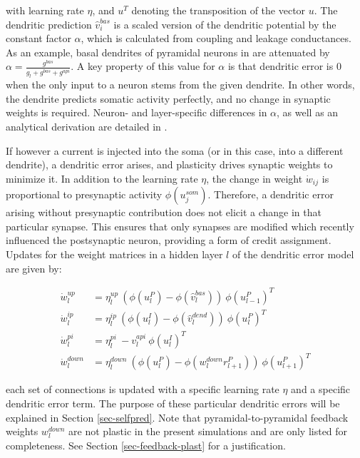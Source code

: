with learning rate $\eta$, and $u^T$ denoting the transposition of the vector $u$. The dendritic prediction
$\hat{v}_i^{bas}$ is a scaled version of the dendritic potential by the constant factor $\alpha$, which is calculated
from coupling and leakage conductances. As an example, basal dendrites of pyramidal neurons in
\citep{sacramento2018dendritic} are attenuated by $\alpha = \frac{g^{bas}}{g_l + g^{bas} + g^{api}}$. A key property of
this value for $\alpha$ is that dendritic error is $0$ when the only input to a neuron stems from the given dendrite.
In other words, the dendrite predicts somatic activity perfectly, and no change in synaptic weights is required. Neuron-
and layer-specific differences in $\alpha$, as well as an analytical derivation are detailed in
\citep{sacramento2018dendritic}.

If however a current is injected into the soma (or in this case, into a different dendrite), a dendritic error arises,
and plasticity drives synaptic weights to minimize it. In addition to the learning rate $\eta$, the change in weight
$\dot{w}_{ij}$ is proportional to presynaptic activity $\phi(u_j^{som})$. Therefore, a dendritic error arising without
presynaptic contribution does not elicit a change in that particular synapse. This ensures that only synapses are
modified which recently influenced the postsynaptic neuron, providing a form of credit assignment. Updates for the
weight matrices in a hidden layer $l$ of the dendritic error model are given by:

\begin{align}
  \dot{w}_{l}^{up}   & = \eta_l^{up} \ ( \phi(u_l^{P}) - \phi(\hat{v}_l^{bas}) ) \ \phi(u_{l-1}^{P})^T\label{eq-delta_w_up}         \\
  \dot{w}_{l}^{ip}   & = \eta_l^{ip} \ ( \phi(u_l^{I}) - \phi(\hat{v}_l^{dend}) ) \ \phi(u_{l}^{P})^T\label{eq-delta_w_ip}          \\
  \dot{w}_{l}^{pi}   & = \eta_l^{pi} \ - v_l^{api} \ \phi(u_l^{I})^T\label{eq-delta_w_pi}                                           \\
  \dot{w}_{l}^{down} & = \eta_l^{down} \ ( \phi(u_l^{P}) - \phi(w_l^{down} r_{l+1}^P) )\ \phi(u_{l+1}^{P})^T\label{eq-delta_w_down}
\end{align}

each set of connections is updated with a specific learning rate $\eta$ and a specific dendritic error term. The purpose
of these particular dendritic errors will be explained in Section \ref{sec-selfpred}. Note that pyramidal-to-pyramidal
feedback weights $w_l^{down}$ are not plastic in the present simulations and are only listed for completeness. See
Section \ref{sec-feedback-plast} for a justification.


